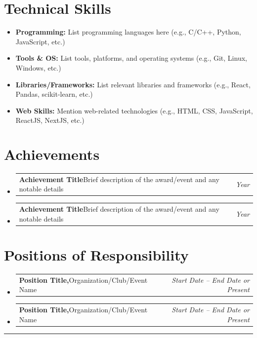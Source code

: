 \documentclass[a4paper,11pt]{article}
\makeatletter
\newcommand{\resumeItem}[2]{
  \item{
    \textbf{#1}{\hspace{0.5mm}#2 \vspace{-0.5mm}}
  }
}
\newcommand{\resumePOR}[3]{
\vspace{0.5mm}\item
    \begin{tabular*}{0.97\textwidth}[t]{l@{\extracolsep{\fill}}r}
        \textbf{#1}\hspace{0.3mm}#2 & \textit{\small{#3}} 
    \end{tabular*}
    \vspace{-2mm}
}
\newcommand{\resumeSubItem}[2]{\resumeItem{#1}{#2}\vspace{-4pt}}
\newcommand{\resumeSubHeadingListStart}{\begin{itemize}[leftmargin=*,labelsep=0mm]}
\newcommand{\resumeHeadingSkillStart}{\begin{itemize}[leftmargin=*,itemsep=1.7mm, rightmargin=2ex]}
\newcommand{\resumeSubHeadingListEnd}{\end{itemize}\vspace{2mm}}
\newcommand{\resumeHeadingSkillEnd}{\end{itemize}\vspace{-2mm}}
\makeatother
\begin{document}
\section{Technical Skills}
\resumeHeadingSkillStart

\resumeSubItem{Programming: } 
  {List programming languages here (e.g., C/C++, Python, JavaScript, etc.)}

\resumeSubItem{Tools \& OS: } 
  {List tools, platforms, and operating systems (e.g., Git, Linux, Windows, etc.)}

\resumeSubItem{Libraries/Frameworks: } 
  {List relevant libraries and frameworks (e.g., React, Pandas, scikit-learn, etc.)}

\resumeSubItem{Web Skills: } 
  {Mention web-related technologies (e.g., HTML, CSS, JavaScript, ReactJS, NextJS, etc.)}

\resumeHeadingSkillEnd




\section{Achievements}
\vspace{-0.4mm}
\resumeSubHeadingListStart

\resumePOR{Achievement Title} 
    {Brief description of the award/event and any notable details} 
    {Year}

\resumePOR{Achievement Title} 
    {Brief description of the award/event and any notable details} 
    {Year}

\resumeSubHeadingListEnd
\vspace{-4mm}





\section{Positions of Responsibility}
\vspace{-0.4mm}
\resumeSubHeadingListStart

\resumePOR{Position Title,} 
    {Organization/Club/Event Name} 
    {Start Date – End Date or Present}

\resumePOR{Position Title,} 
    {Organization/Club/Event Name} 
    {Start Date – End Date or Present}

\resumeSubHeadingListEnd
\vspace{-4mm}






\hspace*{-5mm}\rule{1.035\textwidth}{0.1mm}

\end{document}
